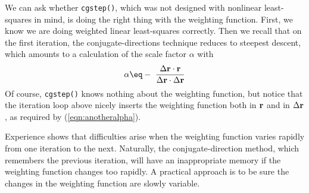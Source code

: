 \begin{comment}
\par
Module \texttt{solver\_irls} \vpageref{/prog:solver_irls}
%
implements the computational template above. In addition to the usual
set of arguments from the \texttt{solver()} subroutine
\vpageref{/prog:smallsolver}, it accepts a user-defined function (parameter
\texttt{wght}) for computing residual weights. Parameters
\texttt{nmem} and \texttt{nfreq} control the restarting schedule of
the iterative scheme.
\moddex{solver_irls}{iteratively reweighted optimization} 
\end{comment}
\par
We can ask whether {\tt cgstep()}, which was not designed
with nonlinear least-squares in mind, is doing the right thing
with the weighting function.
First, we know we are doing weighted linear least-squares correctly.
Then we recall that on the first iteration, the conjugate-directions
technique reduces to steepest descent,
which amounts to a calculation of
the scale factor $\alpha$ with
\begin{equation}
\alpha \eq -\ { 
        \Delta \bold r \cdot \bold r
        \over
        \Delta \bold r \cdot \Delta\bold r
        }
\label{eqn:anotheralpha}
\end{equation}
Of course, {\tt cgstep()} knows nothing about the weighting function,
but notice that the iteration loop above nicely inserts
the weighting function both in $\bold r$ and in $\Delta \bold r$,
as required by (\ref{eqn:anotheralpha}).

\par
Experience shows that difficulties arise
when the weighting function varies rapidly from one iteration to the next.
Naturally, the conjugate-direction method,
which remembers the previous iteration, 
will have an inappropriate memory if 
the weighting function changes too rapidly.
A practical approach is to be sure the changes in the weighting function
are slowly variable.


